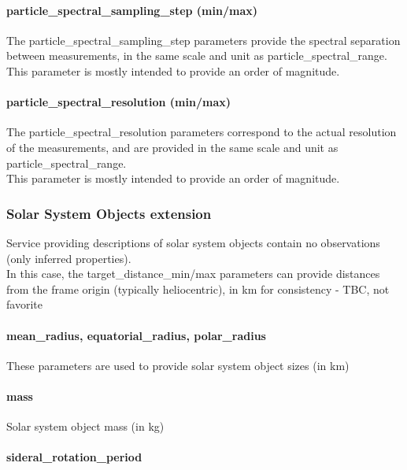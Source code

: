 \documentclass[11pt,a4paper]{ivoa}
\begin{document}
\paragraph{particle\_spectral\_sampling\_step (min/max)}

The particle\_spectral\_sampling\_step parameters provide the spectral separation between measurements, in the same scale and unit as particle\_spectral\_range.\\This parameter is mostly intended to provide an order of magnitude.

\paragraph{particle\_spectral\_resolution (min/max)}

The particle\_spectral\_resolution parameters correspond to the actual resolution of the measurements, and are provided in the same scale and unit as particle\_spectral\_range. \\This parameter is mostly intended to provide an order of magnitude.

\subsubsection{Solar System Objects extension\\}

Service providing descriptions of solar system objects contain no observations (only inferred properties).\\In this case, the target\_distance\_min/max parameters can provide distances from the frame origin (typically heliocentric), in km for consistency - TBC, not favorite

\paragraph{mean\_radius, equatorial\_radius, polar\_radius}

These parameters are used to provide solar system object sizes (in km)

\paragraph{mass}

Solar system object mass (in kg)

\paragraph{sideral\_rotation\_period}
\end{document}
